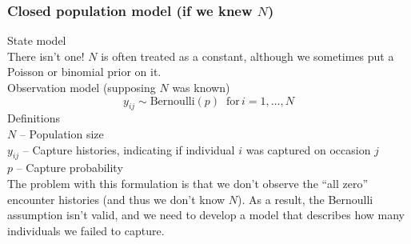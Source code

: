 \documentclass[color=usenames,dvipsnames]{beamer}\usepackage[]{graphicx}\usepackage[]{xcolor}
\begin{document}



\begin{frame}
  \frametitle{\large Closed population model (if we knew $N$) }
  \small
  State model \\
  \vspace{6pt}
  {\centering
    There isn't one! $N$ is often treated as a constant, although we
    sometimes put a Poisson or binomial prior on it.  \\
  }
  \pause
  \vfill
  Observation model (supposing $N$ was known)
  \begin{equation*}
    y_{ij} \sim \mathrm{Bernoulli}(p) \;\; \mathrm{for}\, i=1,\dots,N 
  \end{equation*}
  \pause
  \small
  Definitions \\
  {\footnotesize
  $N$ -- Population size \\
  \hangindent=0.8cm $y_{ij}$ -- Capture histories, indicating if
  individual $i$ was captured on occasion $j$ \\  
  $p$ -- Capture probability \\
  \pause
  \vfill
  The problem with this formulation is that we don't observe the ``all
  zero'' encounter histories (and thus we don't know $N$). \pause As a
  result, the Bernoulli assumption isn't valid, and we need to develop
  a model that describes how many individuals we failed to capture.
  }
\end{frame}
\end{document}
